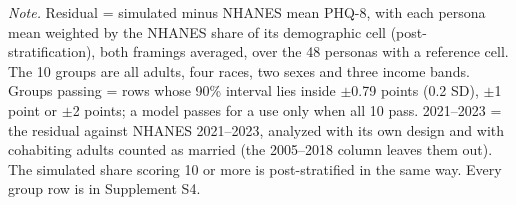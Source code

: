 \begin{table}[tp]
\centering
\caption{Level 3: Post-Stratified Residual of the Simulated Population Against NHANES}
\label{tab:l3}
\small
\setlength{\tabcolsep}{3.5pt}
\vspace{4pt}
\begin{tabnote}
\textit{Note.} Residual = simulated minus NHANES mean PHQ-8, with each persona mean weighted by the NHANES share of its demographic cell (post-stratification), both framings averaged, over the 48 personas with a reference cell. The 10 groups are all adults, four races, two sexes and three income bands. Groups passing = rows whose 90\% interval lies inside $\pm$0.79 points (0.2 SD), $\pm$1 point or $\pm$2 points; a model passes for a use only when all 10 pass. 2021--2023 = the residual against NHANES 2021--2023, analyzed with its own design and with cohabiting adults counted as married (the 2005--2018 column leaves them out). The simulated share scoring 10 or more is post-stratified in the same way. Every group row is in Supplement S4.
\end{tabnote}
\end{table}
